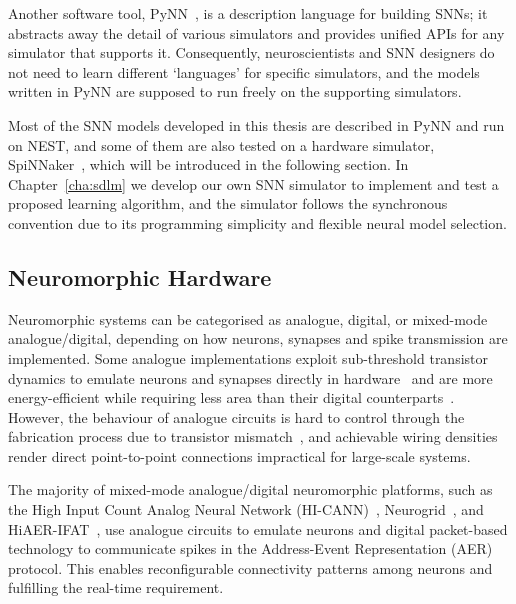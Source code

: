 Another software tool, PyNN~\citep{davison2008pynn}, is a description language for building SNNs;
it abstracts away the detail of various simulators and provides unified APIs for any simulator that supports it.
Consequently, neuroscientists and SNN designers do not need to learn different `languages' for specific simulators, and the models written in PyNN are supposed to run freely on the supporting simulators.

Most of the SNN models developed in this thesis are described in PyNN and run on NEST, and some of them are also tested on a hardware simulator, SpiNNaker~\citep{furber2014spinnaker}, which will be introduced in the following section.
In Chapter~\ref{cha:sdlm} we develop our own SNN simulator to implement and test a proposed learning algorithm, and the simulator follows the synchronous convention due to its programming simplicity and flexible neural model selection. 

\subsection{Neuromorphic Hardware}
\label{subsec:neuromorphic_hw}
Neuromorphic systems can be categorised as analogue, digital, or mixed-mode analogue/digital, depending on how neurons, synapses and spike transmission are implemented. %
Some analogue implementations exploit sub-threshold transistor dynamics to emulate neurons and synapses directly in hardware~\citep{indiveri2011neuromorphic} and are more energy-efficient while requiring less area than their digital counterparts~\citep{joubert2012hardware}.
However, the behaviour of analogue circuits is hard to control through the fabrication process due to transistor mismatch~\citep{indiveri2011neuromorphic,pedram2006thermal,linares2003compact}, and achievable wiring densities render direct point-to-point connections impractical for large-scale systems.

The majority of mixed-mode analogue/digital neuromorphic platforms, such as the High Input Count Analog Neural Network (HI-CANN)~\citep{schemmel2010wafer}, Neurogrid~\citep{benjamin2014neurogrid}, and HiAER-IFAT~\citep{yu201265k}, use analogue circuits to emulate neurons and digital packet-based technology to communicate spikes in the Address-Event Representation (AER)~\citep{lazzaro1995multi} protocol.
This enables reconfigurable connectivity patterns among neurons and fulfilling the real-time requirement.

